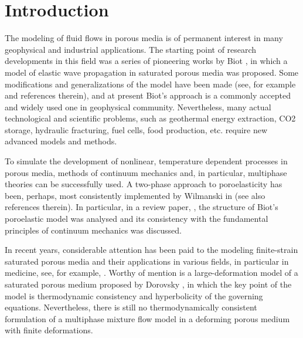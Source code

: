 \documentclass[3p,times,table]{article}
\begin{document}

% 
\section{Introduction} \label{sec:introduction}
%
The modeling of fluid flows in porous media is of permanent interest in many geophysical and 
industrial applications. The starting point of research developments in this field was a series 
of pioneering works by Biot \cite{Biot1956,Biot1956a,Biot1962}, 
in which a model of elastic wave propagation in 
saturated porous media was proposed. Some modifications and generalizations of 
the model 
have been made (see, for example 
\cite{Carcione2010,Masson2006,Winkler1989} and references therein), and at 
present Biot's approach is 
a commonly accepted and widely used one in geophysical community. Nevertheless, many actual 
technological and scientific problems, such as geothermal energy extraction, CO2 storage, hydraulic 
fracturing, fuel cells, food production, etc. require new advanced models and 
methods. 

To simulate the development of nonlinear, temperature dependent processes in porous media, methods of continuum mechanics and, in particular, multiphase theories can be successfully used. 
A two-phase approach to poroelasticity has been, perhaps, most consistently
implemented by Wilmanski in \cite{Wilmanski1998,Wilmanski2006} (see also 
references therein). In particular, in a review paper, \cite{Wilmanski2006}, 
the structure of Biot's poroelastic model was analysed and its consistency 
with the fundamental principles of continuum mechanics was discussed. 

In recent years, considerable attention has been paid to the modeling 
finite-strain saturated porous media and their applications in various 
fields, 
in particular in medicine, see,
for example, \cite{Khoei2011,Rohan2017,Pesavento2017}.
Worthy of mention is a large-deformation model of a saturated porous 
medium proposed by Dorovsky 
\cite{BlokhinDorovsky1995}, in which the key point of the model is  
thermodynamic consistency and hyperbolicity of the governing equations. 
Nevertheless, there is still no  thermodynamically consistent 
formulation of a multiphase mixture flow model in a  deforming porous medium 
with finite deformations. 
\end{document}
